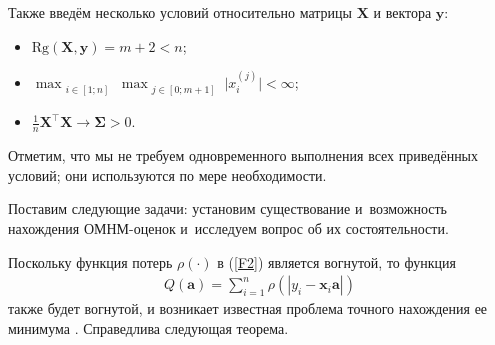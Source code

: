 Также введём несколько условий относительно матрицы $\mathbf{X}$ и
вектора $\mathbf{y}$:

\begin{itemize}
\item[$9^{\circ}$)]  $\mathrm{Rg}(\mathbf{X},\mathbf{y}) = m + 2 <
n$;

\item[$10^{\circ}$)]  
$\max_{\substack{i\in[1;n]}}\max_{\substack{j\in[0;m+1]}}\bigl|x_{i}^{(j)}\bigr| < \infty$;

\item[$11^{\circ}$)]   $\frac 1n\mathbf{X}^{\top}\mathbf{X}
\rightarrow \mathbf{\Sigma} > 0$.

\end{itemize}


Отметим, что мы не требуем одновременного выполнения всех
приведённых условий; они используются по мере необходимости.

Поставим следующие задачи: установим существование и~возможность нахождения ОМНМ-оценок и~исследуем вопрос об их состоятельности.

\smallskip

Поскольку функция потерь $\rho(\cdot)$ в (\ref{F2}) является вогнутой, то функция
\begin{gather} \label{F4}
Q(\mathbf{a}) = \sum_{i=1}^n \rho \left( \left
|y_{i}-\mathbf{x}_{i}\mathbf{a}\right| \right)
\end{gather}
также будет вогнутой, и возникает известная проблема точного
нахождения ее минимума {\cite{seventh}}. Справедлива следующая
теорема.

